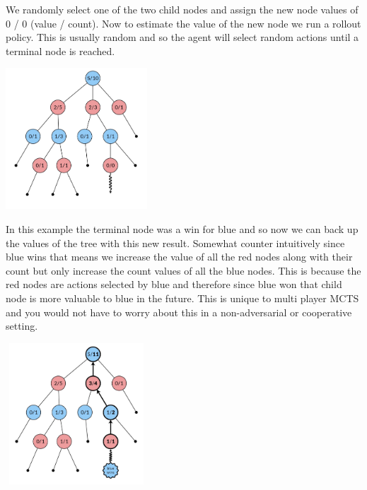 We randomly select one of the two child nodes and assign the new node values of 0 / 0 (value / count). Now to estimate the value of the new node we run a rollout policy. This is usually random and so the agent will select random actions until a terminal node is reached. 

\includegraphics[width=200px,height=200px]{images/mcts_simulation.png}

In this example the terminal node was a win for blue and so now we can back up the values of the tree with this new result. Somewhat counter intuitively since blue wins that means we increase the value of all the red nodes along with their count but only increase the count values of all the blue nodes. This is because the red nodes are actions selected by blue and therefore since blue won that child node is more valuable to blue in the future. This is unique to multi player MCTS and you would not have to worry about this in a non-adversarial or cooperative setting. 

\includegraphics[width=200px,height=200px]{images/mcts_backpropagation.png}



